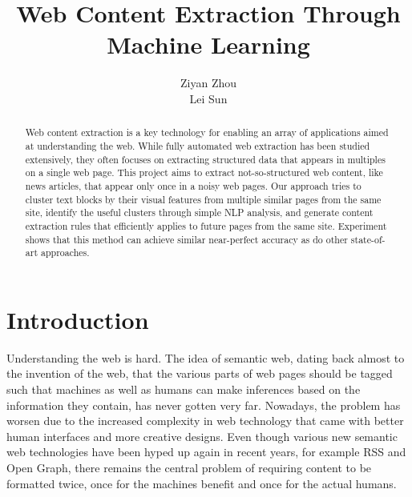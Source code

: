 \documentclass{acm_proc_article-sp}
\begin{document}
\title{Web Content Extraction Through Machine Learning
}

\author{
\alignauthor
Ziyan Zhou\\
\alignauthor
Lei Sun\\
}

\maketitle

\begin{abstract}
Web content extraction is a key technology for enabling an array of applications aimed at understanding the web. While fully automated web extraction has been studied extensively, they often focuses on extracting structured data that appears in multiples on a single web page. This project aims to extract not-so-structured web content, like news articles, that appear only once in a noisy web pages. Our approach tries to cluster text blocks by their visual features from multiple similar pages from the same site, identify the useful clusters through simple NLP analysis, and generate content extraction rules that efficiently applies to future pages from the same site. Experiment shows that this method can achieve similar near-perfect accuracy as do other state-of-art approaches.

\end{abstract}


\section{Introduction}

Understanding the web is hard. The idea of semantic web, dating back almost to the invention of the web, that the various parts of web pages should be tagged such that machines as well as humans can make inferences based on the information they contain, has never gotten very far. Nowadays, the problem has worsen due to the increased complexity in web technology that came with better human interfaces and more creative designs. Even though various new semantic web technologies have been hyped up again in recent years, for example RSS and Open Graph, there remains the central problem of requiring content to be formatted twice, once for the machines benefit and once for the actual humans.
\end{document}
